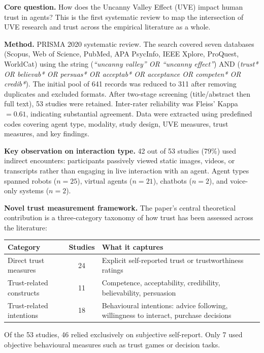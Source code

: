 \documentclass[11pt, a4paper]{article}
\begin{document}
\textbf{Core question.} How does the Uncanny Valley Effect (UVE) impact human trust in agents? This is the first systematic review to map the intersection of UVE research and trust across the empirical literature as a whole.

\textbf{Method.} PRISMA 2020 systematic review. The search covered seven databases (Scopus, Web of Science, PubMed, APA PsycInfo, IEEE Xplore, ProQuest, WorldCat) using the string (\textit{``uncanny valley'' OR ``uncanny effect''}) AND (\textit{trust* OR believab* OR persuas* OR acceptab* OR acceptance OR competen* OR credib*}). The initial pool of 641 records was reduced to 311 after removing duplicates and excluded formats. After two-stage screening (title/abstract then full text), 53 studies were retained. Inter-rater reliability was Fleiss' Kappa $= 0.61$, indicating substantial agreement. Data were extracted using predefined codes covering agent type, modality, study design, UVE measures, trust measures, and key findings.

\textbf{Key observation on interaction type.} 42 out of 53 studies (79\%) used indirect encounters: participants passively viewed static images, videos, or transcripts rather than engaging in live interaction with an agent. Agent types spanned robots ($n = 25$), virtual agents ($n = 21$), chatbots ($n = 2$), and voice-only systems ($n = 2$).

\textbf{Novel trust measurement framework.} The paper's central theoretical contribution is a three-category taxonomy of how trust has been assessed across the literature:

\begin{center}
\begin{tabular}{p{3.5cm}cp{7cm}}
\toprule
\textbf{Category} & \textbf{Studies} & \textbf{What it captures} \\
\midrule
Direct trust measures & 24 & Explicit self-reported trust or trustworthiness ratings \\[4pt]
Trust-related constructs & 11 & Competence, acceptability, credibility, believability, persuasion \\[4pt]
Trust-related intentions & 18 & Behavioural intentions: advice following, willingness to interact, purchase decisions \\
\bottomrule
\end{tabular}
\end{center}

Of the 53 studies, 46 relied exclusively on subjective self-report. Only 7 used objective behavioural measures such as trust games or decision tasks.
\end{document}
